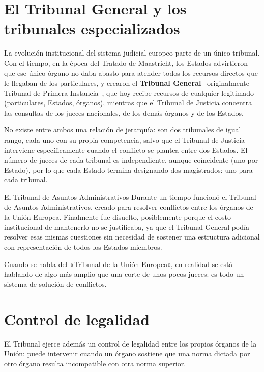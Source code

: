 \documentclass[12pt,oneside]{book}
\begin{document}
\section{El Tribunal General y los tribunales especializados}

La evolución institucional del sistema judicial europeo parte de un único tribunal. Con el tiempo, en la época del Tratado de Maastricht, los Estados advirtieron que ese único órgano no daba abasto para atender todos los recursos directos que le llegaban de los particulares, y crearon el \textbf{Tribunal General} --originalmente Tribunal de Primera Instancia--, que hoy recibe recursos de cualquier legitimado (particulares, Estados, órganos), mientras que el Tribunal de Justicia concentra las consultas de los jueces nacionales, de los demás órganos y de los Estados.

No existe entre ambos una relación de jerarquía: son dos tribunales de igual rango, cada uno con su propia competencia, salvo que el Tribunal de Justicia interviene específicamente cuando el conflicto se plantea entre dos Estados. El número de jueces de cada tribunal es independiente, aunque coincidente (uno por Estado), por lo que cada Estado termina designando dos magistrados: uno para cada tribunal.

\begin{ejemplo}{El Tribunal de Asuntos Administrativos}
Durante un tiempo funcionó el Tribunal de Asuntos Administrativos, creado para resolver conflictos entre los órganos de la Unión Europea. Finalmente fue disuelto, posiblemente porque el costo institucional de mantenerlo no se justificaba, ya que el Tribunal General podía resolver esas mismas cuestiones sin necesidad de sostener una estructura adicional con representación de todos los Estados miembros.
\end{ejemplo}

Cuando se habla del «Tribunal de la Unión Europea», en realidad se está hablando de algo más amplio que una corte de unos pocos jueces: es todo un sistema de solución de conflictos.

\section{Control de legalidad}

El Tribunal ejerce además un control de legalidad entre los propios órganos de la Unión: puede intervenir cuando un órgano sostiene que una norma dictada por otro órgano resulta incompatible con otra norma superior.
\end{document}
